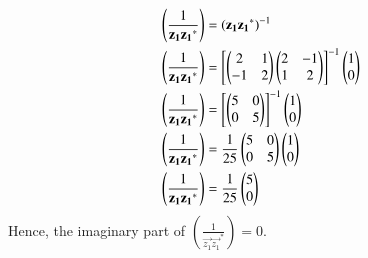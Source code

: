 \documentclass[journal,12pt,twocolumn]{IEEEtran}
\begin{document}
\begin{align}
&\left(\frac{1}{\mathbf{z_1}\mathbf{z_1}^*}\right)=(\mathbf{z_1}\mathbf{z_1}^*)^{-1}\label{eq:eqn_8}\\
&\left(\frac{1}{\mathbf{z_1}\mathbf{z_1}^*}\right)=\left[\begin{pmatrix}2 & 1\\ -1 & 2\end{pmatrix}\begin{pmatrix}2 & -1\\ 1 & 2\end{pmatrix}\right]^{-1}\begin{pmatrix}1 \\0\end{pmatrix}\label{eq:eqn_9}\\
&\left(\frac{1}{\mathbf{z_1}\mathbf{z_1}^*}\right)=\left[\begin{pmatrix}5 & 0\\ 0 & 5\end{pmatrix}\right]^{-1}\begin{pmatrix}1 \\0\end{pmatrix}\label{eq:eqn_10}\\
&\left(\frac{1}{\mathbf{z_1}\mathbf{z_1}^*}\right)=\frac{1}{25}\begin{pmatrix}5 & 0\\ 0 & 5\end{pmatrix}\begin{pmatrix}1 \\0\end{pmatrix}\label{eq:eqn_11}\\
&\left(\frac{1}{\mathbf{z_1}\mathbf{z_1}^*}\right)=\frac{1}{25}\begin{pmatrix}5 \\ 0\end{pmatrix}\label{eq:eqn_12}
\end{align}
Hence, the imaginary part of $\left(\frac{1}{\vec{z_1}\vec{z_1}^*}\right)=0$.
\end{document}
